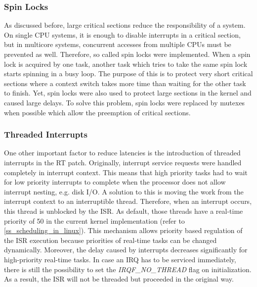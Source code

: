 \subsubsection{Spin Locks}
As discussed before, large critical sections reduce the responsibility of a system.
On single \ac{CPU} systems, it is enough to disable interrupts in a critical section, but in multicore systems, concurrent accesses from multiple \acp{CPU} must be prevented as well.
Therefore, so called spin locks were implemented. 
When a spin lock is acquired by one task, another task which tries to take the same spin lock starts spinning in a busy loop.
The purpose of this is to protect very short critical sections where a context switch takes more time than waiting for the other task to finish.
Yet, spin locks were also used to protect large sections in the kernel and caused large delays.
To solve this problem, spin locks were replaced by mutexes when possible which allow the preemption of critical sections.   

\subsubsection{Threaded Interrupts}\label{ss_threaded_interrupts}
One other important factor to reduce latencies is the introduction of threaded interrupts in the RT patch.
Originally, interrupt service requests were handled completely in interrupt context.
This means that high priority tasks had to wait for low priority interrupts to complete when the processor does not allow interrupt nesting, e.g. disk \ac{I/O}.
A solution to this is moving the work from the interrupt context to an interruptible thread.
Therefore, when an interrupt occurs, this thread is unblocked by the \ac{ISR}.
As default, those threads have a real-time priority of 50 in the current kernel implementation (refer to \ref{ss_scheduling_in_linux}).
This mechanism allows priority based regulation of the \ac{ISR} execution because priorities of real-time tasks can be changed dynamically. 
Moreover, the delay caused by interrupts decreases significantly for high-priority real-time tasks.
In case an \ac{IRQ} has to be serviced immediately, there is still the possibility to set the \textit{IRQF\_NO\_THREAD} flag on initialization.
As a result, the \ac{ISR} will not be threaded but proceeded in the original way.

